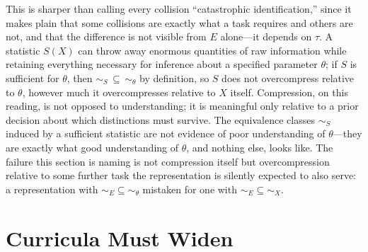 \documentclass[11pt]{article}
\theoremstyle{plain}
\begin{document}
This is sharper than calling every collision ``catastrophic identification,'' since it makes plain that some collisions are exactly what a task requires and others are not, and that the difference is not visible from $E$ alone---it depends on $\tau$. A statistic $S(X)$ can throw away enormous quantities of raw information while retaining everything necessary for inference about a specified parameter $\theta$; if $S$ is sufficient for $\theta$, then $\sim_S \, \subseteq \, \sim_\theta$ by definition, so $S$ does not overcompress relative to $\theta$, however much it overcompresses relative to $X$ itself. Compression, on this reading, is not opposed to understanding; it is meaningful only relative to a prior decision about which distinctions must survive. The equivalence classes $\sim_S$ induced by a sufficient statistic are not evidence of poor understanding of $\theta$---they are exactly what good understanding of $\theta$, and nothing else, looks like. The failure this section is naming is not compression itself but overcompression relative to some further task the representation is silently expected to also serve: a representation with $\sim_E \subseteq \sim_\theta$ mistaken for one with $\sim_E \subseteq \sim_X$.

\section{Curricula Must Widen}
\label{sec:curricula}
\end{document}
